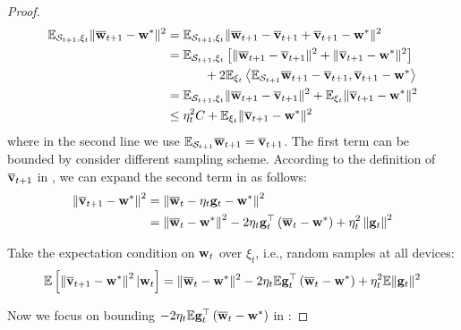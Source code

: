 \begin{proof}
	

\begin{align}
\mathbb{E}_{{\mathcal{S}}_{t+1}, \xi_{t}} \|\overline{{\mathbf{w}}}_{t+1} - {\mathbf{w}}^*\|^2 &= \mathbb{E}_{{\mathcal{S}}_{t+1}, \xi_{t}} \|\overline{{\mathbf{w}}}_{t+1} - \overline{{\mathbf{v}}}_{t+1} + \overline{{\mathbf{v}}}_{t+1} - {\mathbf{w}}^*\|^2\\
&= \mathbb{E}_{{\mathcal{S}}_{t+1}, \xi_{t}} \left[\|\overline{{\mathbf{w}}}_{t+1} - \overline{{\mathbf{v}}}_{t+1}\|^2 + \|\overline{{\mathbf{v}}}_{t+1} - {\mathbf{w}}^*\|^2\right] \\
& \hspace{3em}+ 2\mathbb{E}_{\xi_{t}} \left<\mathbb{E}_{{\mathcal{S}}_{t+1}} \overline{{\mathbf{w}}}_{t+1} - \overline{{\mathbf{v}}}_{t+1},   \overline{{\mathbf{v}}}_{t+1} - {\mathbf{w}}^*\right> \\
& = \mathbb{E}_{{\mathcal{S}}_{t+1}, \xi_{t}} \|\overline{{\mathbf{w}}}_{t+1} - \overline{{\mathbf{v}}}_{t+1}\|^2 + \mathbb{E}_{\xi_t} \|\overline{{\mathbf{v}}}_{t+1} - {\mathbf{w}}^*\|^2 \\
& \leq  \eta_t^2 C + \mathbb{E}_{\xi_t} \|\overline{{\mathbf{v}}}_{t+1} - {\mathbf{w}}^*\|^2 \label{eq:sgdcvxsmth1}
\end{align}
where in the second line we use $\mathbb{E}_{{\mathcal{S}}_{t+1}} \overline{{\mathbf{w}}}_{t+1}  = \overline{{\mathbf{v}}}_{t+1}$. 
The first term can be bounded by consider different sampling scheme. 
According to the definition of $\overline{{\mathbf{v}}}_{t+1}$ in \eq{\ref{eq:vbar}}, we can expand the second term in \eq{\ref{eq:sgdcvxsmth1}} as follows:
$$\begin{aligned}\left\|{\overline{\mathbf{v}}}_{t+1}-{\mathbf{w}}^{*}\right\|^2 &=\left\|{\overline{\mathbf{w}}}_{t}-\eta_{t} {\mathbf{g}}_{t}-{\mathbf{w}}^{*}\right\|^2 \\ &=\left\|{\overline{\mathbf{w}}}_{t}-{\mathbf{w}}^{*}\right\|^{2}-2 \eta_{t} {\mathbf{g}}_{t}^{\top}\left({\overline{\mathbf{w}}}_{t}-{\mathbf{w}}^{*}\right)+\eta_{t}^{2}\left\|{\mathbf{g}}_{t}\right\|^{2} \end{aligned}$$

Take the expectation condition on ${\mathbf{w}}_t$ over $\xi_t$, i.e., random samples at all devices:
\begin{align}
\mathbb{E}\left[\left\|{\overline{\mathbf{v}}}_{t+1}-{\mathbf{w}}^{*}\right\|^2| {\mathbf{w}}_{t}\right]=\|{\overline{\mathbf{w}}}_{t}-{\mathbf{w}}^{*}\|^{2}-2 \eta_{t} \mathbb{E} {\mathbf{g}}_{t}^{\top}\left({\overline{\mathbf{w}}}_{t}-{\mathbf{w}}^{*}\right)+\eta_{t}^{2} \mathbb{E}\| {\mathbf{g}}_{t} \|^{2}	
\label{eq:expandsgd}
\end{align}

Now we focus on bounding $-2 \eta_{t} \mathbb{E} {\mathbf{g}}_{t}^{\top}\left({\overline{\mathbf{w}}}_{t}-{\mathbf{w}}^{*}\right)$ in \eq{\ref{eq:expandsgd}}: 


\end{proof}
